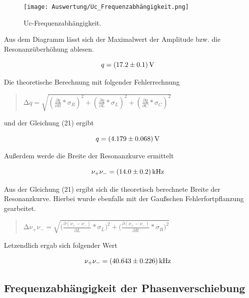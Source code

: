 \begin{figure}[H]
  \centering
  \texttt{[image: Auswertung/Uc\_Frequenzabhängigkeit.png]}
  \caption{Uc-Frequenzabhängigkeit.}
  \label{fig:2}
\end{figure}

Aus dem Diagramm lässt sich der Maximalwert der Amplitude bzw. die Resonanzüberhöhung ablesen.

\begin{equation}
	{q} = \SI{17.2 \pm 0.1}{\V}
\end{equation}

Die theoretische Berechnung mit folgender Fehlerrechnung

\begin{quote}
$\increment q = \sqrt{(\frac{\partial q}{\partial R} * \sigma_{R})^2 + (\frac{\partial q}{\partial L} * \sigma_{L})^2+(\frac{\partial q}{\partial C} * \sigma_{C})^2}$
\end{quote}

und der Gleichung (21) ergibt 

\begin{equation}
	{q} = \SI{4.179 \pm 0.068}{\V}
\end{equation}

Außerdem werde die Breite der Resonanzkurve ermittelt

\begin{equation}
	{\nu_+ \nu_-} = \SI{14 \pm 0.2}{\kHz}
\end{equation}

Aus der Gleichung (21) ergibt sich die theoretisch berechnete Breite der Resonanzkurve.
Hierbei wurde ebenfalls mit der Gaußschen Fehlerfortpflanzung gearbeitet.
 
\begin{quote}
$\increment \nu_+ \nu_- = \sqrt{\bigl(\frac{\partial (\nu_+ - \nu_-)}{\partial L} * \sigma_{L}\bigr)^2 + \bigl(\frac{\partial (\nu_+ - \nu_-)}{\partial R} * \sigma_{R}\bigr)^2}$
\end{quote}

Letzendlich ergab sich folgender Wert 

\begin{equation}
	{\nu_+ \nu_-} = \SI{40.643 \pm 0.226}{\kHz}
\end{equation}

\subsection{Frequenzabhängigkeit der Phasenverschiebung}

